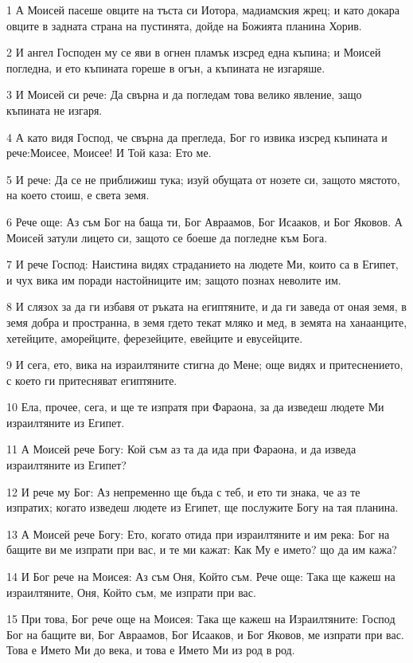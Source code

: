 \par 1 А Моисей пасеше овците на тъста си Иотора, мадиамския жрец; и като докара овците в задната страна на пустинята, дойде на Божията планина Хорив.
\par 2 И ангел Господен му се яви в огнен пламък изсред една къпина; и Моисей погледна, и ето къпината гореше в огън, а къпината не изгаряше.
\par 3 И Моисей си рече: Да свърна и да погледам това велико явление, защо къпината не изгаря.
\par 4 А като видя Господ, че свърна да прегледа, Бог го извика изсред къпината и рече:Моисее, Моисее! И Той каза: Ето ме.
\par 5 И рече: Да се не приближиш тука; изуй обущата от нозете си, защото мястото, на което стоиш, е света земя.
\par 6 Рече още: Аз съм Бог на баща ти, Бог Авраамов, Бог Исааков, и Бог Яковов. А Моисей затули лицето си, защото се боеше да погледне към Бога.
\par 7 И рече Господ: Наистина видях страданието на людете Ми, които са в Египет, и чух вика им поради настойниците им; защото познах неволите им.
\par 8 И слязох за да ги избавя от ръката на египтяните, и да ги заведа от оная земя, в земя добра и пространна, в земя гдето текат мляко и мед, в земята на ханаанците, хетейците, аморейците, ферезейците, евейците и евусейците.
\par 9 И сега, ето, вика на израилтяните стигна до Мене; още видях и притеснението, с което ги притесняват египтяните.
\par 10 Ела, прочее, сега, и ще те изпратя при Фараона, за да изведеш людете Ми израилтяните из Египет.
\par 11 А Моисей рече Богу: Кой съм аз та да ида при Фараона, и да изведа израилтяните из Египет?
\par 12 И рече му Бог: Аз непременно ще бъда с теб, и ето ти знака, че аз те изпратих; когато изведеш людете из Египет, ще послужите Богу на тая планина.
\par 13 А Моисей рече Богу: Ето, когато отида при израилтяните и им река: Бог на бащите ви ме изпрати при вас, и те ми кажат: Как Му е името? що да им кажа?
\par 14 И Бог рече на Моисея: Аз съм Оня, Който съм. Рече още: Така ще кажеш на израилтяните, Оня, Който съм, ме изпрати при вас.
\par 15 При това, Бог рече още на Моисея: Така ще кажеш на Израилтяните: Господ Бог на бащите ви, Бог Авраамов, Бог Исааков, и Бог Яковов, ме изпрати при вас. Това е Името Ми до века, и това е Името Ми из род в род.
